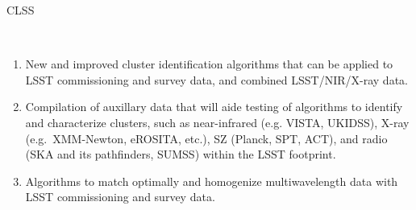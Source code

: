 {\begin{tasklist}{CLSS}
\begin{task}
{~
\begin{enumerate}
\item New and improved cluster identification algorithms that can be 
applied to LSST commissioning and survey data, and combined 
LSST/NIR/X-ray data.
\item Compilation of auxillary data that will aide testing of algorithms 
to identify and characterize clusters, such as near-infrared (e.g. 
VISTA, UKIDSS), X-ray (e.g.~XMM-Newton, eROSITA, etc.), SZ (Planck, SPT, 
ACT), and radio (SKA and its pathfinders, SUMSS) within the LSST 
footprint.
\item Algorithms to match optimally and homogenize multiwavelength 
data with LSST commissioning and survey data.
\end{enumerate}
}
\end{task}


\end{tasklist}}
